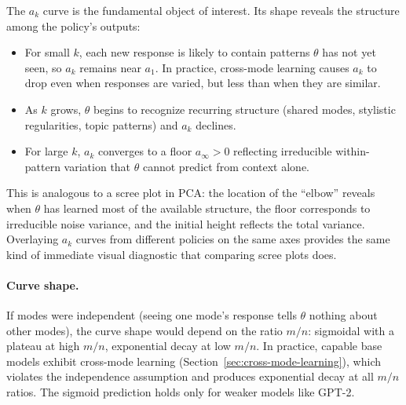 The $a_k$ curve is the fundamental object of interest.
Its shape reveals the structure among the policy's outputs:
\begin{itemize}[nosep]
    \item For small $k$, each new response is likely to contain patterns $\theta$ has not yet seen, so $a_k$ remains near $a_1$.
In practice, cross-mode learning causes $a_k$ to drop even when responses are varied, but less than when they are similar.
    \item As $k$ grows, $\theta$ begins to recognize recurring structure (shared modes, stylistic regularities, topic patterns) and $a_k$ declines.
    \item For large $k$, $a_k$ converges to a floor $a_\infty > 0$ reflecting irreducible within-pattern variation that $\theta$ cannot predict from context alone.
\end{itemize}

This is analogous to a scree plot in PCA: the location of the ``elbow'' reveals when $\theta$ has learned most of the available structure, the floor corresponds to irreducible noise variance, and the initial height reflects the total variance.
Overlaying $a_k$ curves from different policies on the same axes provides the same kind of immediate visual diagnostic that comparing scree plots does.

\paragraph{Curve shape.} If modes were independent (seeing one mode's response tells $\theta$ nothing about other modes), the curve shape would depend on the ratio $m/n$: sigmoidal with a plateau at high $m/n$, exponential decay at low $m/n$.
In practice, capable base models exhibit cross-mode learning (Section~\ref{sec:cross-mode-learning}), which violates the independence assumption and produces exponential decay at all $m/n$ ratios.
The sigmoid prediction holds only for weaker models like GPT-2.

